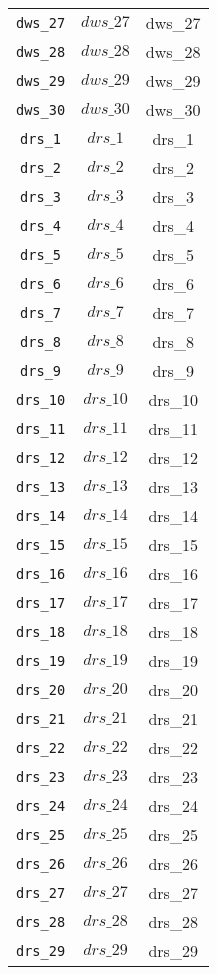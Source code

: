 \begin{center}
\begin{longtable}{ccc}
\texttt{dws\_27} & $dws\_27$ & dws\_27\\
\texttt{dws\_28} & $dws\_28$ & dws\_28\\
\texttt{dws\_29} & $dws\_29$ & dws\_29\\
\texttt{dws\_30} & $dws\_30$ & dws\_30\\
\texttt{drs\_1} & $drs\_1$ & drs\_1\\
\texttt{drs\_2} & $drs\_2$ & drs\_2\\
\texttt{drs\_3} & $drs\_3$ & drs\_3\\
\texttt{drs\_4} & $drs\_4$ & drs\_4\\
\texttt{drs\_5} & $drs\_5$ & drs\_5\\
\texttt{drs\_6} & $drs\_6$ & drs\_6\\
\texttt{drs\_7} & $drs\_7$ & drs\_7\\
\texttt{drs\_8} & $drs\_8$ & drs\_8\\
\texttt{drs\_9} & $drs\_9$ & drs\_9\\
\texttt{drs\_10} & $drs\_10$ & drs\_10\\
\texttt{drs\_11} & $drs\_11$ & drs\_11\\
\texttt{drs\_12} & $drs\_12$ & drs\_12\\
\texttt{drs\_13} & $drs\_13$ & drs\_13\\
\texttt{drs\_14} & $drs\_14$ & drs\_14\\
\texttt{drs\_15} & $drs\_15$ & drs\_15\\
\texttt{drs\_16} & $drs\_16$ & drs\_16\\
\texttt{drs\_17} & $drs\_17$ & drs\_17\\
\texttt{drs\_18} & $drs\_18$ & drs\_18\\
\texttt{drs\_19} & $drs\_19$ & drs\_19\\
\texttt{drs\_20} & $drs\_20$ & drs\_20\\
\texttt{drs\_21} & $drs\_21$ & drs\_21\\
\texttt{drs\_22} & $drs\_22$ & drs\_22\\
\texttt{drs\_23} & $drs\_23$ & drs\_23\\
\texttt{drs\_24} & $drs\_24$ & drs\_24\\
\texttt{drs\_25} & $drs\_25$ & drs\_25\\
\texttt{drs\_26} & $drs\_26$ & drs\_26\\
\texttt{drs\_27} & $drs\_27$ & drs\_27\\
\texttt{drs\_28} & $drs\_28$ & drs\_28\\
\texttt{drs\_29} & $drs\_29$ & drs\_29\\

\end{longtable}
\end{center}

